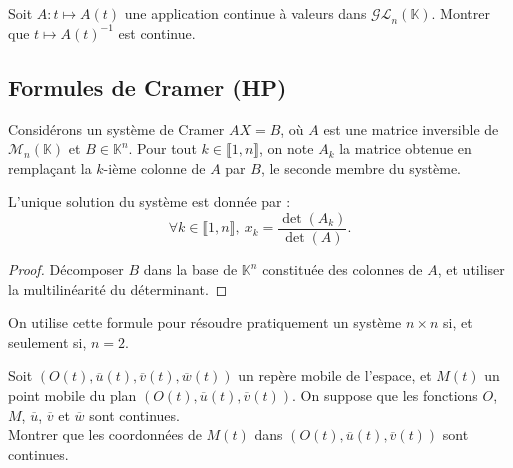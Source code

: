 \documentclass[french]{article}
\newcommand{\K}{\mathbb{K}}
\newcommand{\inv}{^{-1}}
\theoremstyle{plain}
\theoremstyle{definition}
\theoremstyle{remark}
\begin{document}
\begin{exo}
	Soit $A:t\mapsto A(t)$ une application continue à valeurs dans $\mathcal{GL}_n(\K)$. Montrer que $t\mapsto A(t)\inv$ est continue.
\end{exo}

\subsection{Formules de Cramer (HP)}

Considérons un système de Cramer $AX=B$, où $A$ est une matrice inversible de $\mathcal{M}_n(\K)$ et $B\in\K^n$. Pour tout $k\in\llbracket1,n\rrbracket$, on note $A_k$ la matrice obtenue en remplaçant la $k$-ième colonne de $A$ par $B$, le seconde membre du système.

\begin{thm}%
	L'unique solution du système est donnée par :
	$$\forall k\in\llbracket1,n\rrbracket,\ x_k=\frac{\det(A_k)}{\det(A)}.$$
\end{thm}
\begin{proof}
	Décomposer $B$ dans la base de $\K^n$ constituée des colonnes de $A$, et utiliser la multilinéarité du déterminant.
\end{proof}

\begin{met}
	On utilise cette formule pour résoudre pratiquement un système $n\times n$ si, et seulement si, $n=2$.
\end{met}

\begin{exo}
	Soit $(O(t),\overline{u}(t),\overline{v}(t),\overline{w}(t))$ un repère mobile de l'espace, et $M(t)$ un point mobile du plan $(O(t),\overline{u}(t),\overline{v}(t))$. On suppose que les fonctions $O$, $M$, $\overline{u}$, $\overline{v}$ et $\overline{w}$ sont continues.\\
	Montrer que les coordonnées de $M(t)$ dans $(O(t),\overline{u}(t),\overline{v}(t))$ sont continues.
\end{exo}
\end{document}
